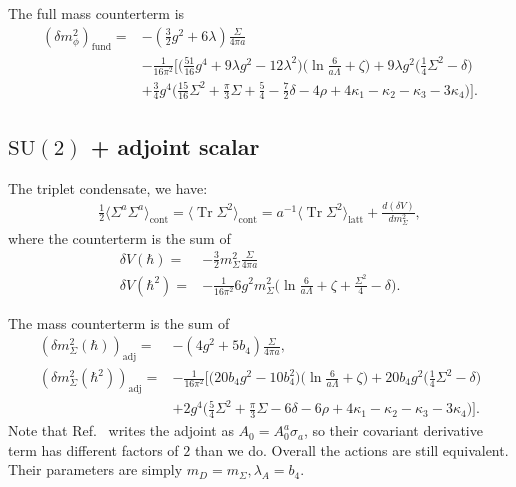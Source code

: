 \documentclass[11pt,a4paper]{article}
\newcommand\Tr{\operatorname{Tr}}
\newcommand\gr[1]{\mathrm{#1}}%
\begin{document}
The full mass counterterm is
\begin{align}
(\delta m^2_\phi)_\text{fund} =& -(\frac32 g^2 + 6\lambda) \frac{\Sigma}{4\pi a} \nonumber \\
&- \frac{1}{16\pi^2}\Big[ \Big( \frac{51}{16}g^4 + 9\lambda g^2 - 12\lambda^2 \Big)\Big( \ln \frac{6}{a\Lambda}+\zeta \Big)
 + 9\lambda g^2 \Big( \frac14 \Sigma^2 - \delta \Big) \nonumber \\ 
& + \frac34 g^4 \Big( \frac{15}{16}\Sigma^2 + \frac{\pi}{3} \Sigma + \frac54 - \frac72 \delta - 4\rho +4\kappa_1 - \kappa_2 - \kappa_3 - 3\kappa_4  \Big) \Big].
\end{align}


\subsection{$\gr{SU(2)}$ + adjoint scalar}

The triplet condensate, we have:
\begin{align}
\frac12 \langle \Sigma^a\Sigma^a\rangle_\text{cont} = \langle\Tr \Sigma^2\rangle_\text{cont} = a^{-1} \langle \Tr \Sigma^2 \rangle_\text{latt} + \frac{d(\delta V)}{dm^2_\Sigma},
\end{align}
where the counterterm is the sum of
\begin{align}
\label{eq:vacuumCT_adj}
\delta V(\hbar) =& -\frac32 m^2_\Sigma \frac{\Sigma}{4\pi a} \nonumber \\
\delta V(\hbar^2) =& -\frac{1}{16\pi^2} 6g^2 m^2_\Sigma \Big( \ln \frac{6}{a \Lambda} +\zeta + \frac{\Sigma^2}{4} - \delta\Big).
\end{align}

The mass counterterm is the sum of
\begin{align}
(\delta m^2_\Sigma(\hbar))_\text{adj} =& -(4g^2 + 5 b_4) \frac{\Sigma}{4\pi a}, \\
(\delta m^2_\Sigma(\hbar^2))_\text{adj} =& -\frac{1}{16\pi^2} \Big[ \Big( 20 b_4 g^2 - 10 b^2_4 \Big)\Big( \ln\frac{6}{a \Lambda} + \zeta \Big) +20 b_4 g^2 \Big( \frac14 \Sigma^2 - \delta \Big) \nonumber \\
 &+ 2 g^4 \Big( \frac54 \Sigma^2 + \frac{\pi}{3}\Sigma - 6\delta -6\rho + 4\kappa_1 -\kappa_2 - \kappa_3 - 3\kappa_4 \Big) \Big].
\end{align}
Note that Ref.~\cite{Laine:1995np} writes the adjoint as $A_0 = A^a_0 \sigma_a$, so their covariant derivative term has different factors of $2$ than we do. Overall the actions are still equivalent. Their parameters are simply $m_D = m_\Sigma, \lambda_A = b_4$.
\end{document}

